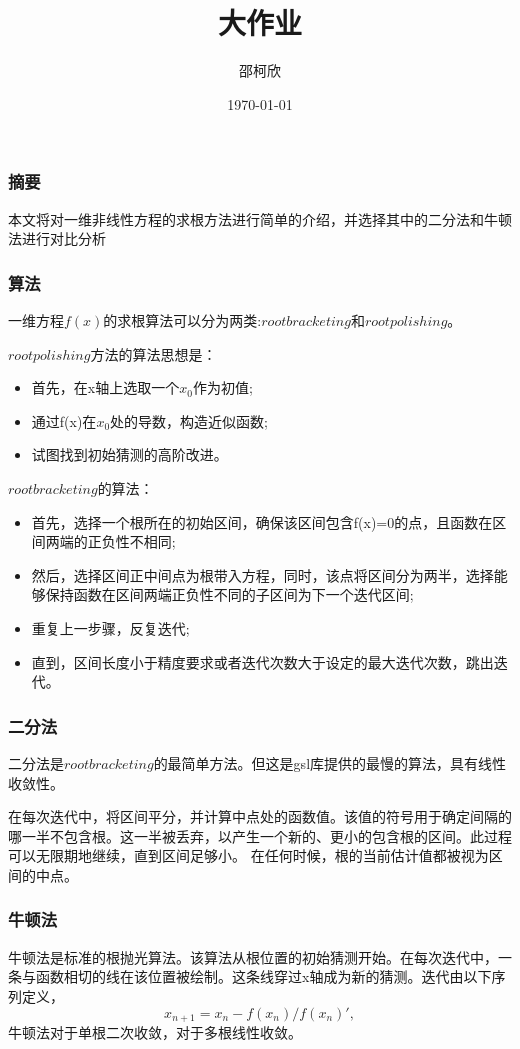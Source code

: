 \documentclass{beamer}
\begin{document}
\title{大作业}
\author{邵柯欣}
\date{\today}

\begin{frame}
  \frametitle{摘要}
  本文将对一维非线性方程的求根方法进行简单的介绍，并选择其中的二分法和牛顿法进行对比分析
\end{frame}

\begin{frame}
  \frametitle{算法}
  一维方程$f(x)$的求根算法可以分为两类:$root bracketing$和$root polishing$。\par
  $root polishing$方法的算法思想是：
  \begin{itemize}
  \item 首先，在x轴上选取一个$x_0$作为初值;
  \item 通过f(x)在$x_0$处的导数，构造近似函数;
  \item 试图找到初始猜测的高阶改进。
  \end{itemize}
\end{frame}

\begin{frame}
  $root bracketing$的算法：
  \begin{itemize}
  \item 首先，选择一个根所在的初始区间，确保该区间包含f(x)=0的点，且函数在区间两端的正负性不相同;
  \item 然后，选择区间正中间点为根带入方程，同时，该点将区间分为两半，选择能够保持函数在区间两端正负性不同的子区间为下一个迭代区间;
  \item 重复上一步骤，反复迭代;
  \item 直到，区间长度小于精度要求或者迭代次数大于设定的最大迭代次数，跳出迭代。
  \end{itemize}
\end{frame}

\begin{frame}
  \frametitle{二分法}
  二分法是$root bracketing$的最简单方法。但这是gsl库提供的最慢的算法，具有线性收敛性。\par
  在每次迭代中，将区间平分，并计算中点处的函数值。该值的符号用于确定间隔的哪一半不包含根。这一半被丢弃，以产生一个新的、更小的包含根的区间。此过程可以无限期地继续，直到区间足够小。
在任何时候，根的当前估计值都被视为区间的中点。
\end{frame}

\begin{frame}
  \frametitle{牛顿法}
  牛顿法是标准的根抛光算法。该算法从根位置的初始猜测开始。在每次迭代中，一条与函数相切的线在该位置被绘制。这条线穿过x轴成为新的猜测。迭代由以下序列定义，
  \begin{equation}
    x_{n+1} = x_n-f(x_n)/f(x_n)',
  \end{equation}
  牛顿法对于单根二次收敛，对于多根线性收敛。
\end{frame}
\end{document}
